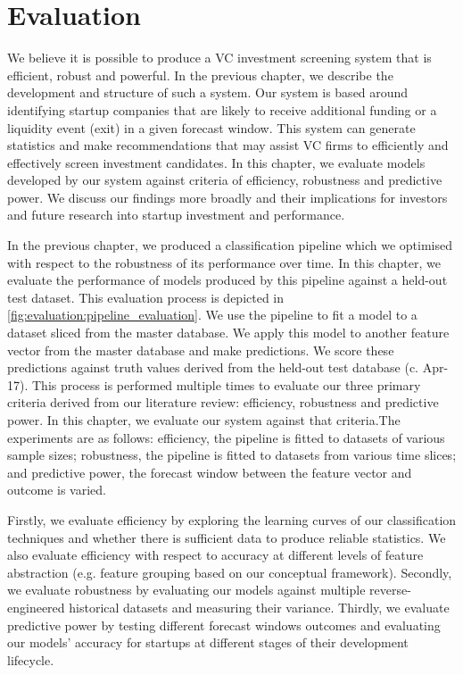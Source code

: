 \documentclass[../thesis/thesis.tex]{subfiles}
\begin{document}
\chapter{Evaluation}
\label{chap:evaluation}

We believe it is possible to produce a VC investment screening system that is efficient, robust and powerful. In the previous chapter, we describe the development and structure of such a system. Our system is based around identifying startup companies that are likely to receive additional funding or a liquidity event (exit) in a given forecast window. This system can generate statistics and make recommendations that may assist VC firms to efficiently and effectively screen investment candidates. In this chapter, we evaluate models developed by our system against criteria of efficiency, robustness and predictive power. We discuss our findings more broadly and their implications for investors and future research into startup investment and performance.

In the previous chapter, we produced a classification pipeline which we optimised with respect to the robustness of its performance over time. In this chapter, we evaluate the performance of models produced by this pipeline against a held-out test dataset. This evaluation process is depicted in \ref{fig:evaluation:pipeline_evaluation}. We use the pipeline to fit a model to a dataset sliced from the master database. We apply this model to another feature vector from the master database and make predictions. We score these predictions against truth values derived from the held-out test database (c. Apr-17). This process is performed multiple times to evaluate our three primary criteria derived from our literature review: efficiency, robustness and predictive power. In this chapter, we evaluate our system against that criteria.The experiments are as follows: efficiency, the pipeline is fitted to datasets of various sample sizes; robustness, the pipeline is fitted to datasets from various time slices; and predictive power, the forecast window between the feature vector and outcome is varied.

Firstly, we evaluate efficiency by exploring the learning curves of our classification techniques and whether there is sufficient data to produce reliable statistics. We also evaluate efficiency with respect to accuracy at different levels of feature abstraction (e.g. feature grouping based on our conceptual framework). Secondly, we evaluate robustness by evaluating our models against multiple reverse-engineered historical datasets and measuring their variance. Thirdly, we evaluate predictive power by testing different forecast windows outcomes and evaluating our models’ accuracy for startups at different stages of their development lifecycle.
\end{document}
